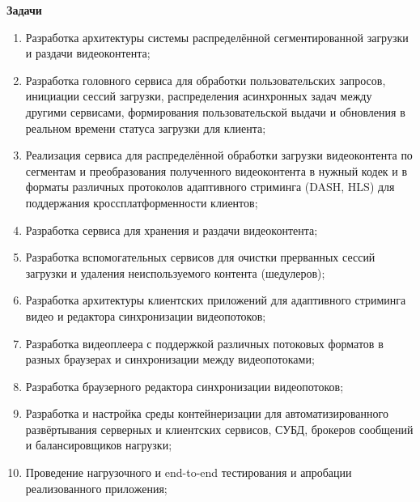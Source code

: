 	\textbf{Задачи}

	\begin{enumerate}[1.]
		\item Разработка архитектуры системы распределённой сегментированной загрузки и раздачи видеоконтента;
		\item Разработка головного сервиса для обработки пользовательских запросов, инициации сессий загрузки, распределения асинхронных задач между другими сервисами, формирования пользовательской выдачи и обновления в реальном времени статуса загрузки для клиента;
		\item Реализация сервиса для распределённой обработки загрузки видеоконтента по сегментам и преобразования полученного видеоконтента в нужный кодек и в форматы различных протоколов адаптивного стриминга (DASH, HLS) для поддержания кроссплатформенности клиентов;
		\item Разработка сервиса для хранения и раздачи видеоконтента;
		\item Разработка вспомогательных сервисов для очистки прерванных сессий загрузки и удаления неиспользуемого контента (шедулеров);
		\item Разработка архитектуры клиентских приложений для адаптивного стриминга видео и редактора синхронизации видеопотоков;
		\item Разработка видеоплеера с поддержкой различных потоковых форматов в разных браузерах и синхронизации между видеопотоками;
		\item Разработка браузерного редактора синхронизации видеопотоков;
		\item Разработка и настройка среды контейнеризации для автоматизированного развёртывания серверных и клиентских сервисов, СУБД, брокеров сообщений и балансировщиков нагрузки;
		\item Проведение нагрузочного и end-to-end тестирования и апробации реализованного приложения;
	\end{enumerate}